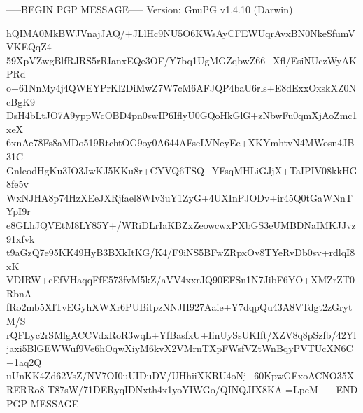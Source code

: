 -----BEGIN PGP MESSAGE-----
Version: GnuPG v1.4.10 (Darwin)

hQIMA0MkBWJVnajJAQ/+JLlHc9NU5O6KWsAyCFEWUqrAvxBN0NkeSfumVVKEQqZ4
59XpVZwgBlfRJRS5rRIanxEQe3OF/Y7bq1UgMGZqbwZ66+Xfl/EsiNUczWyAKPRd
o+61NnMy4j4QWEYPrKl2DiMwZ7W7cM6AFJQP4baU6rls+E8dExxOxskXZ0NcBgK9
DsH4bLtJO7A9yppWcOBD4pn0swIP6IflyU0GQoHkGlG+zNbwFu0qmXjAoZmc1xeX
6xnAe78Fs8aMDo519RtchtOG9oy0A644AFseLVNeyEe+XKYmhtvN4MWosn4JB31C
GnleodHgKu3IO3JwKJ5KKu8r+CYVQ6TSQ+YFsqMHLiGJjX+TaIPIV08kkHG8fe5v
WxNJHA8p74HzXEeJXRjfael8WIv3uY1ZyG+4UXInPJODv+ir45Q0tGaWNnTYpI9r
e8GLhJQVEtM8LY85Y+/WRiDLrIaKBZxZeowcwxPXbGS3eUMBDNaIMKJJvz91xfvk
t9aGzQ7e95KK49HyB3BXkItKG/K4/F9iNS5BFwZRpxOv8TYeRvDb0sv+rdlqI8xK
VDIRW+cEfVHaqqFfE573fvM5kZ/aVV4xxrJQ90EFSn1N7JibF6YO+XMZrZT0RbnA
fRo2mb5XITvEGyhXWXr6PUBitpzNNJH927Aaie+Y7dqpQu43A8VTdgt2zGrytM/S
rQFLyc2rSMlgACCVdxRoR3wqL+YfBasfxU+IinUySsUKIft/XZV8q8pSzfb/42Yl
jaxi5BlGEWWuf9Ve6hOqwXiyM6kvX2VMrnTXpFWsfVZtWnBqyPVTUcXN6C+1aq2Q
uUnKK4Zd62VsZ/NV7OI0uUIDuDV/UHhiiXKRU4oNj+60KpwGFxoACNO35XRERRo8
T87sW/71DERyqIDNxth4x1yoYIWGo/QINQJIX8KA
=LpeM
-----END PGP MESSAGE-----
